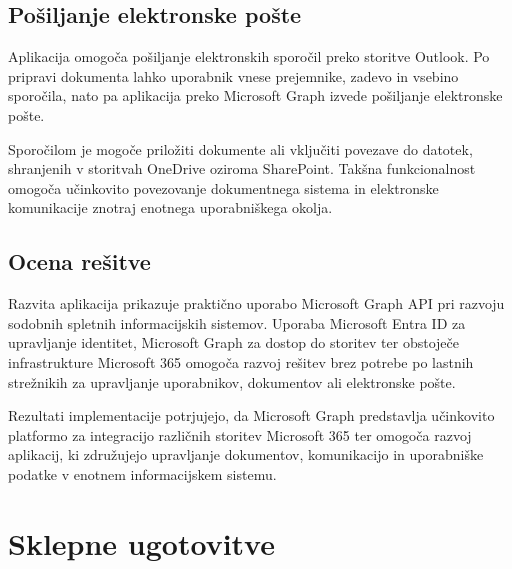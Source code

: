 \documentclass[a4paper, 12pt]{book}
\begin{document}
\section{Pošiljanje elektronske pošte}

Aplikacija omogoča pošiljanje elektronskih sporočil preko storitve Outlook.
Po pripravi dokumenta lahko uporabnik vnese prejemnike, zadevo in vsebino sporočila, nato pa aplikacija preko Microsoft Graph izvede pošiljanje elektronske pošte.

Sporočilom je mogoče priložiti dokumente ali vključiti povezave do datotek, shranjenih v storitvah OneDrive oziroma SharePoint.
Takšna funkcionalnost omogoča učinkovito povezovanje dokumentnega sistema in elektronske komunikacije znotraj enotnega uporabniškega okolja.

\section{Ocena rešitve}

Razvita aplikacija prikazuje praktično uporabo Microsoft Graph API pri razvoju sodobnih spletnih informacijskih sistemov. Uporaba Microsoft Entra ID za upravljanje identitet, Microsoft Graph za dostop do storitev ter obstoječe infrastrukture Microsoft 365 omogoča razvoj rešitev brez potrebe po lastnih strežnikih za upravljanje uporabnikov, dokumentov ali elektronske pošte.

Rezultati implementacije potrjujejo, da Microsoft Graph predstavlja učinkovito platformo za integracijo različnih storitev Microsoft 365 ter omogoča razvoj aplikacij, ki združujejo upravljanje dokumentov, komunikacijo in uporabniške podatke v enotnem informacijskem sistemu.




\chapter{Sklepne ugotovitve}




\cleardoublepage
{}


\end{document}
